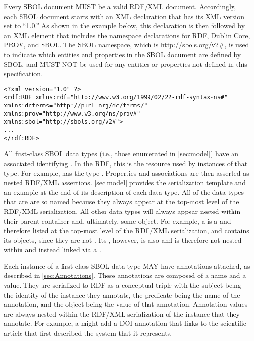Every SBOL document MUST be a valid RDF/XML document. 
Accordingly, each SBOL document starts with an XML declaration that has its XML version set to ``1.0.'' As shown in the example below, this declaration is then followed by an  XML element that includes the namespace declarations for RDF, Dublin Core, PROV, and SBOL. The SBOL namespace, which is \url{http://sbols.org/v2#}, is used to indicate which entities and properties in the SBOL document are defined by SBOL, and MUST NOT be used for any entities or properties not defined in this specification.
\label{xml-namespace}

\begin{lstlisting}
<?xml version="1.0" ?>
<rdf:RDF xmlns:rdf="http://www.w3.org/1999/02/22-rdf-syntax-ns#" xmlns:dcterms="http://purl.org/dc/terms/" xmlns:prov="http://www.w3.org/ns/prov#" xmlns:sbol="http://sbols.org/v2#">
...
</rdf:RDF>
\end{lstlisting}

All first-class SBOL data types (i.e., those enumerated in \ref{sec:model}) have an associated identifying . In the RDF, this is the resource  used by instances of that type. For example,  has the
type  .
Properties and associations are then asserted as nested RDF/XML assertions. 
\ref{sec:model} provides the serialization template and an example at the end of its description of each data type.
All of the data types that are  are so named because they always appear at the top-most level of the RDF/XML serialization. All other data types will always appear nested within their parent container and, ultimately, some  object.
For example, a  is a  and therefore listed at the top-most level of the RDF/XML serialization, and contains its   objects, since they are not .  Its , however, is also  and is therefore not nested within and instead linked via a .

Each instance of a first-class SBOL data type MAY have annotations attached, as described in \ref{sec:Annotations}. These annotations are composed of a name and a value.  They are serialized to RDF as a conceptual triple with the subject being the identity of the instance they annotate, the predicate being the name of the annotation, and the object being the value of that annotation. Annotation values are always nested within the RDF/XML serialization of the instance that they annotate.
For example, a  might add a DOI annotation that links to the scientific article that first described the system that it represents.

